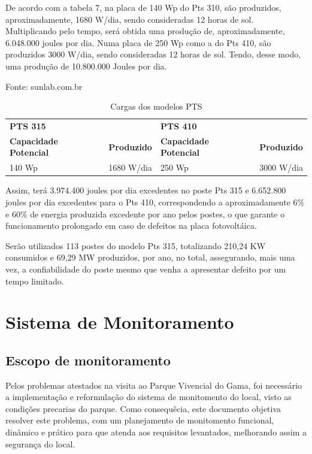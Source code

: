 	De acordo com a tabela 7, na placa de 140 Wp do Pts 310, são produzidos, aproximadamente, 1680 W/dia, sendo consideradas 12 horas de sol. Multiplicando pelo tempo, será obtida uma produção de, aproximadamente,  6.048.000 joules por dia.
	Numa placa de 250 Wp como a do Pts 410, são produzidos 3000 W/dia, sendo consideradas 12 horas de sol. Tendo, desse modo, uma produção de 10.800.000 Joules por dia.
	
\begin{table}[H]
\center
\caption{Cargas dos modelos PTS}
\small{Fonte: sunlab.com.br}
\begin{tabular}{llll}
 &  &  &  \\ \hline
\multicolumn{2}{|l|}{\textbf{PTS 315}} & \multicolumn{2}{l|}{\textbf{PTS 410}} \\ \hline
\multicolumn{1}{|l|}{\textbf{Capacidade Potencial}} & \multicolumn{1}{l|}{\textbf{Produzido}} & \multicolumn{1}{l|}{\textbf{Capacidade Potencial}} & \multicolumn{1}{l|}{\textbf{Produzido}} \\ \hline
\multicolumn{1}{|l|}{140 Wp} & \multicolumn{1}{l|}{1680 W/dia} & \multicolumn{1}{l|}{250 Wp} & \multicolumn{1}{l|}{3000 W/dia} \\ \hline
\end{tabular}
\end{table}

	Assim, terá 3.974.400 joules por dia excedentes no poste Pts 315 e 6.652.800 joules por dia excedentes para o Pts 410, correspondendo a aproximadamente 6\% e 60\% de energia produzida excedente por ano pelos postes, o que garante o funcionamento prolongado em caso de defeitos na placa fotovoltáica.

	Serão utilizados 113 postes do modelo Pts 315, totalizando 210,24 KW consumidos e 69,29 MW produzidos, por ano, no total, assegurando, mais uma vez, a confiabilidade do poste mesmo que venha a apresentar defeito por um tempo limitado.

\section{Sistema de Monitoramento}

\subsection{Escopo de monitoramento}
	Pelos problemas atestados na visita ao Parque Vivencial do Gama, foi necessário a implementação e reformulação do sistema de monitomento do local, visto as condições precarias do parque. Como consequêcia, este documento objetiva resolver este problema, com um planejamento de monitomento funcional, dinâmico e prático para que atenda aos requisitos levantados,  melhorando assim a segurança do local.
	
